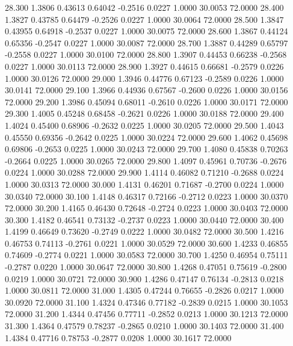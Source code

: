   28.300   1.3806   0.43613   0.64042  -0.2516   0.0227   1.0000  30.0053  72.0000
  28.400   1.3827   0.43785   0.64479  -0.2526   0.0227   1.0000  30.0064  72.0000
  28.500   1.3847   0.43955   0.64918  -0.2537   0.0227   1.0000  30.0075  72.0000
  28.600   1.3867   0.44124   0.65356  -0.2547   0.0227   1.0000  30.0087  72.0000
  28.700   1.3887   0.44289   0.65797  -0.2558   0.0227   1.0000  30.0100  72.0000
  28.800   1.3907   0.44453   0.66238  -0.2568   0.0227   1.0000  30.0113  72.0000
  28.900   1.3927   0.44615   0.66681  -0.2579   0.0226   1.0000  30.0126  72.0000
  29.000   1.3946   0.44776   0.67123  -0.2589   0.0226   1.0000  30.0141  72.0000
  29.100   1.3966   0.44936   0.67567  -0.2600   0.0226   1.0000  30.0156  72.0000
  29.200   1.3986   0.45094   0.68011  -0.2610   0.0226   1.0000  30.0171  72.0000
  29.300   1.4005   0.45248   0.68458  -0.2621   0.0226   1.0000  30.0188  72.0000
  29.400   1.4024   0.45400   0.68906  -0.2632   0.0225   1.0000  30.0205  72.0000
  29.500   1.4043   0.45550   0.69356  -0.2642   0.0225   1.0000  30.0224  72.0000
  29.600   1.4062   0.45698   0.69806  -0.2653   0.0225   1.0000  30.0243  72.0000
  29.700   1.4080   0.45838   0.70263  -0.2664   0.0225   1.0000  30.0265  72.0000
  29.800   1.4097   0.45961   0.70736  -0.2676   0.0224   1.0000  30.0288  72.0000
  29.900   1.4114   0.46082   0.71210  -0.2688   0.0224   1.0000  30.0313  72.0000
  30.000   1.4131   0.46201   0.71687  -0.2700   0.0224   1.0000  30.0340  72.0000
  30.100   1.4148   0.46317   0.72166  -0.2712   0.0223   1.0000  30.0370  72.0000
  30.200   1.4165   0.46430   0.72648  -0.2724   0.0223   1.0000  30.0403  72.0000
  30.300   1.4182   0.46541   0.73132  -0.2737   0.0223   1.0000  30.0440  72.0000
  30.400   1.4199   0.46649   0.73620  -0.2749   0.0222   1.0000  30.0482  72.0000
  30.500   1.4216   0.46753   0.74113  -0.2761   0.0221   1.0000  30.0529  72.0000
  30.600   1.4233   0.46855   0.74609  -0.2774   0.0221   1.0000  30.0583  72.0000
  30.700   1.4250   0.46954   0.75111  -0.2787   0.0220   1.0000  30.0647  72.0000
  30.800   1.4268   0.47051   0.75619  -0.2800   0.0219   1.0000  30.0721  72.0000
  30.900   1.4286   0.47147   0.76134  -0.2813   0.0218   1.0000  30.0811  72.0000
  31.000   1.4305   0.47244   0.76655  -0.2826   0.0217   1.0000  30.0920  72.0000
  31.100   1.4324   0.47346   0.77182  -0.2839   0.0215   1.0000  30.1053  72.0000
  31.200   1.4344   0.47456   0.77711  -0.2852   0.0213   1.0000  30.1213  72.0000
  31.300   1.4364   0.47579   0.78237  -0.2865   0.0210   1.0000  30.1403  72.0000
  31.400   1.4384   0.47716   0.78753  -0.2877   0.0208   1.0000  30.1617  72.0000
